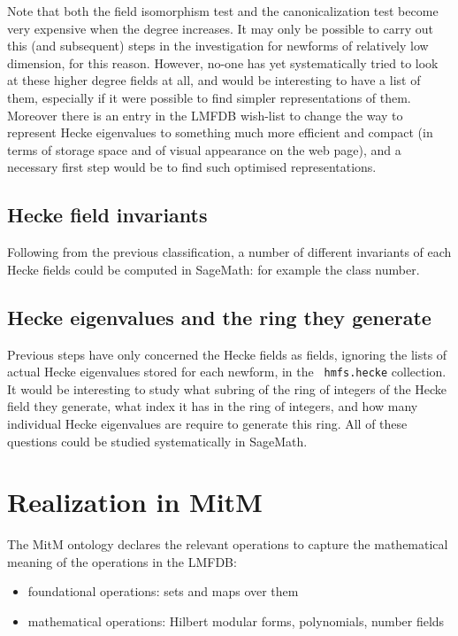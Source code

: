 \documentclass{llncs}
\begin{document}
Note that both the field isomorphism test and the canonicalization
test become very expensive when the degree increases.  It may only be
possible to carry out this (and subsequent) steps in the investigation
for newforms of relatively low dimension, for this reason.  However,
no-one has yet systematically tried to look at these higher degree
fields at all, and would be interesting to have a list of them,
especially if it were possible to find simpler representations of
them.  Moreover there is an entry in the LMFDB wish-list to change the
way to represent Hecke eigenvalues to something much more efficient
and compact (in terms of storage space and of visual appearance on the
web page), and a necessary first step would be to find such optimised
representations.

\subsection{Hecke field invariants} Following from the previous
classification, a number of different invariants of each Hecke fields
could be computed in SageMath: for example the class number.

\subsection{Hecke eigenvalues and the ring they generate} Previous
steps have only concerned the Hecke fields as fields, ignoring the
lists of actual Hecke eigenvalues stored for each newform, in the {\tt
  hmfs.hecke} collection.  It would be interesting to study what
subring of the ring of integers of the Hecke field they generate, what
index it has in the ring of integers, and how many individual Hecke
eigenvalues are require to generate this ring.  All of these questions
could be studied systematically in SageMath.

\section{Realization in MitM}

The MitM ontology declares the relevant operations to capture the mathematical meaning of the operations in the LMFDB:
\begin{itemize}
\item foundational operations: sets and maps over them
\item mathematical operations: Hilbert modular forms, polynomials, number fields
\end{itemize}
\end{document}
